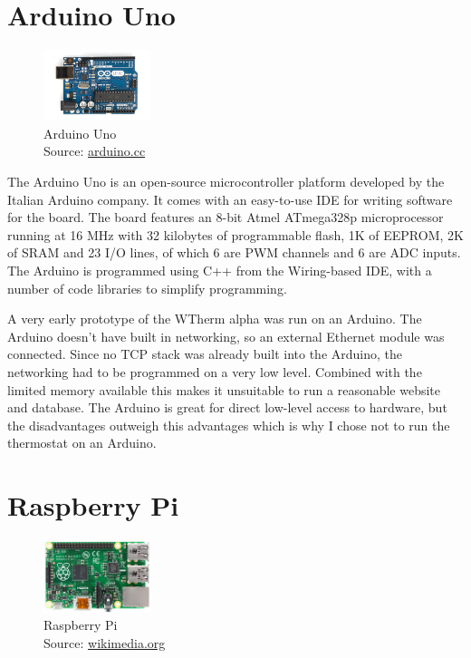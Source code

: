 \documentclass[12pt,a4paper,final]{report}
\newcommand*{\captionsource}[2]{%
  \caption[{#1}]{%
    #1%
    \\\hspace{\linewidth}%
    Source: #2%
  }%
}
\begin{document}
\section*{Arduino Uno}
\begin{figure}
  \vspace{-33pt}
  \begin{center}
      \includegraphics[width=0.28\textwidth]{arduinounor3}
  \end{center}
  \vspace{-20pt}
  \captionsource{Arduino Uno}{\url{arduino.cc}}
\end{figure}
The Arduino Uno is an open-source microcontroller platform developed by the Italian Arduino company. It comes with an easy-to-use IDE for writing software for the board. The board features an 8-bit Atmel ATmega328p microprocessor running at 16 MHz with 32 kilobytes of programmable flash, 1K of EEPROM, 2K of SRAM and 23 I/O lines, of which 6 are PWM channels and 6 are ADC inputs\cite{atmega328p}. The Arduino is programmed using C++ from the Wiring-based IDE, with a number of code libraries to simplify programming\cite{arduinounorev3}.

A very early prototype of the WTherm alpha was run on an Arduino. The Arduino doesn't have built in networking, so an external Ethernet module was connected. Since no TCP stack was already built into the Arduino, the networking had to be programmed on a very low level. Combined with the limited memory available this makes it unsuitable to run a reasonable website and database. The Arduino is great for direct low-level access to hardware, but the disadvantages outweigh this advantages which is why I chose not to run the thermostat on an Arduino.
\newpage
\section*{Raspberry Pi}
\begin{figure}
  \vspace{-33pt}
  \begin{center}
      \includegraphics[width=0.28\textwidth]{RaspberryPiTop}
  \end{center}
  \vspace{-20pt}
  \captionsource{Raspberry Pi}{\url{wikimedia.org}}
\end{figure}
\end{document}
